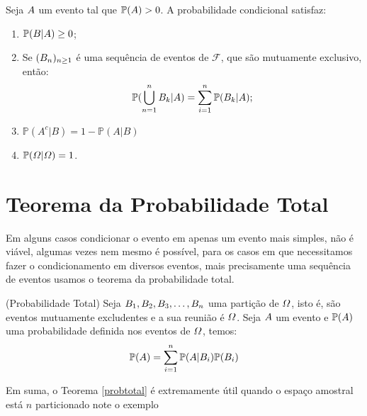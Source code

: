 \begin{prop}
     Seja $\mathnormal{A}$ um evento tal que $\mathbb{P}(\mathnormal{A})>0$. A probabilidade condicional satisfaz:
	\begin{enumerate}
		\item[(i)]$\mathbb{P}(\mathnormal{B|A}) \geq 0$;
		\item[(ii)] Se $(\mathnormal{B_n})_{\mathnormal{n} \geq 1}$ é uma sequência de eventos de $\mathcal{F}$, que são mutuamente exclusivo, então:
		\begin{equation*}
		\mathbb{P}(\bigcup_{\mathnormal{n}=1}^{\mathnormal{n}}\mathnormal{B_k}|\mathnormal{A}) =  \displaystyle \sum_{\mathnormal{i}=1}^{\mathnormal{n}} \mathbb{P}(\mathnormal{B_k|A}); 
		\end{equation*}
		\item[(iii)] $\mathbb{P}(A^c|B) = 1 - \mathbb{P}(A|B)$
		\item[(iv)] $\mathbb{P}(\mathnormal{\Omega}|\mathnormal{\Omega}) = 1$.
	\end{enumerate}
\end{prop}
\section{Teorema da Probabilidade Total}
Em alguns casos condicionar o evento em apenas um evento mais simples, não é viável, algumas vezes nem mesmo é possível, para os casos em que necessitamos fazer o condicionamento em diversos eventos, mais precisamente uma sequência de eventos usamos o teorema da probabilidade total.
\begin{teo}{(Probabilidade Total)}
\label{probtotal}
Seja $\mathnormal{B}_1, \mathnormal{B}_2, \mathnormal{B}_3, \dots, \mathnormal{B_n}$ uma partição de  $\mathnormal{\Omega}$, isto é, são eventos mutuamente excludentes e a sua reunião é $\mathnormal{\Omega}$. Seja $\mathnormal{A}$ um evento e $\mathbb{P}(\mathnormal{A})$ uma probabilidade definida nos eventos de $\mathnormal{\Omega}$, temos:
	\begin{equation*}
		\mathbb{P}(\mathnormal{A}) = \displaystyle \sum_{\mathnormal{i}=1}^{\mathnormal{n}}\mathbb{P}(\mathnormal{A|B_i})\mathbb{P}(\mathnormal{B_i})
	\end{equation*}
\end{teo}
	Em suma, o Teorema \ref{probtotal} é extremamente útil quando o espaço amostral está $n$ particionado note o exemplo

